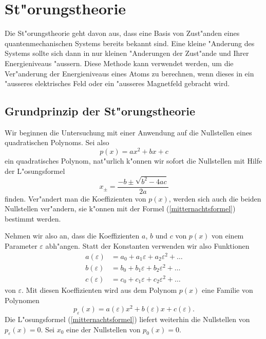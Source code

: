 \chapter{St"orungstheorie}
\rhead{}
Die St"orungstheorie geht davon aus, dass eine Basis von Zust"anden eines
quantenmechanischen Systems bereits bekannt sind. Eine kleine
"Anderung des Systems sollte sich dann in nur kleinen "Anderungen
der Zust"ande und Ihrer Energieniveaus "aussern.
Diese Methode kann verwendet werden, um die Ver"anderung der Energieniveaus
eines Atoms zu berechnen, wenn dieses in ein "ausseres elektrisches Feld
oder ein "ausseres Magnetfeld gebracht wird.

\section{Grundprinzip der St"orungstheorie}
Wir beginnen die Untersuchung mit einer Anwendung auf die Nullstellen
eines quadratischen Polynoms. Sei also
\[
p(x) = ax^2 + bx + c
\]
ein quadratisches Polynom, nat"urlich k"onnen wir sofort die Nullstellen
mit Hilfe der L"osungsformel
\begin{equation}
x_{\pm}=\frac{-b\pm\sqrt{b^2-4ac}}{2a}
\label{mitternachtsformel}
\end{equation}
finden.  Ver"andert man die Koeffizienten von $p(x)$, werden sich auch
die beiden Nullstellen ver"andern, sie k"onnen mit der Formel
(\ref{mitternachtsformel}) bestimmt werden.

Nehmen wir also an, dass die Koeffizienten $a$, $b$ und $c$ von $p(x)$
von einem Parameter $\varepsilon$ abh"angen. Statt der Konstanten verwenden
wir also Funktionen
\begin{align*}
a(\varepsilon)&=a_0+a_1\varepsilon+a_2\varepsilon^2+\dots\\
b(\varepsilon)&=b_0+b_1\varepsilon+b_2\varepsilon^2+\dots\\
c(\varepsilon)&=c_0+c_1\varepsilon+c_2\varepsilon^2+\dots
\end{align*}
von $\varepsilon$. Mit diesen Koeffizienten wird aus dem Polynom $p(x)$
eine Familie von Polynomen
\[
p_\varepsilon(x)=a(\varepsilon)x^2 + b(\varepsilon)x+c(\varepsilon).
\]
Die L"osungsformel (\ref{mitternachtsformel}) liefert weiterhin die
Nullstellen von $p_{\varepsilon}(x)=0$.
Sei $x_0$ eine der Nullstellen von $p_0(x) = 0$.

